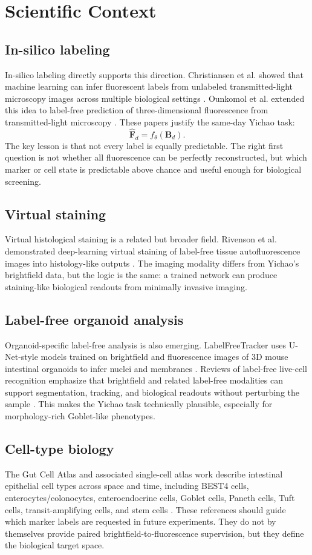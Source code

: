 \documentclass[11pt]{article}
\newcommand{\B}{\mathbf{B}}
\newcommand{\F}{\mathbf{F}}
\begin{document}
\section{Scientific Context}
\subsection{In-silico labeling}
In-silico labeling directly supports this direction. Christiansen et al. showed that machine learning can infer fluorescent labels from unlabeled transmitted-light microscopy images across multiple biological settings \cite{christiansen2018}. Ounkomol et al. extended this idea to label-free prediction of three-dimensional fluorescence from transmitted-light microscopy \cite{ounkomol2018}. These papers justify the same-day Yichao task:
\[
\hat{\F}_{d}=f_{\theta}(\B_d).
\]
The key lesson is that not every label is equally predictable. The right first question is not whether all fluorescence can be perfectly reconstructed, but which marker or cell state is predictable above chance and useful enough for biological screening.

\subsection{Virtual staining}
Virtual histological staining is a related but broader field. Rivenson et al. demonstrated deep-learning virtual staining of label-free tissue autofluorescence images into histology-like outputs \cite{rivenson2019}. The imaging modality differs from Yichao's brightfield data, but the logic is the same: a trained network can produce staining-like biological readouts from minimally invasive imaging.

\subsection{Label-free organoid analysis}
Organoid-specific label-free analysis is also emerging. LabelFreeTracker uses U-Net-style models trained on brightfield and fluorescence images of 3D mouse intestinal organoids to infer nuclei and membranes \cite{labelFreeTracker2025}. Reviews of label-free live-cell recognition emphasize that brightfield and related label-free modalities can support segmentation, tracking, and biological readouts without perturbing the sample \cite{chen2024}. This makes the Yichao task technically plausible, especially for morphology-rich Goblet-like phenotypes.

\subsection{Cell-type biology}
The Gut Cell Atlas and associated single-cell atlas work describe intestinal epithelial cell types across space and time, including BEST4 cells, enterocytes/colonocytes, enteroendocrine cells, Goblet cells, Paneth cells, Tuft cells, transit-amplifying cells, and stem cells \cite{gutcellatlas,elmentaite2021}. These references should guide which marker labels are requested in future experiments. They do not by themselves provide paired brightfield-to-fluorescence supervision, but they define the biological target space.
\end{document}
